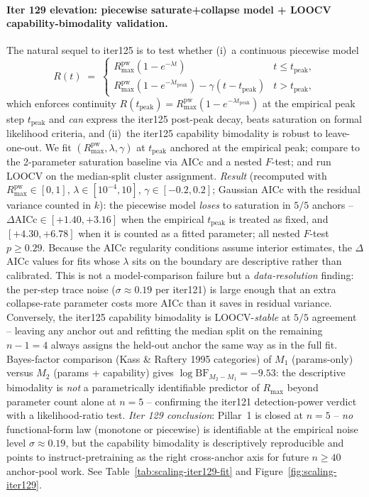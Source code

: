 \paragraph{Iter 129 elevation: piecewise saturate+collapse model + LOOCV capability-bimodality validation.}
\label{par:scaling-iter129}
The natural sequel to iter125 is to test whether (i)~a continuous
piecewise model
\begin{equation}
  \label{eq:scaling-iter129-pw}
  R(t) \;=\; \begin{cases}
    R_{\max}^{\text{pw}}(1 - e^{-\lambda t}) & t \le t_\mathrm{peak}, \\
    R_{\max}^{\text{pw}}(1 - e^{-\lambda t_\mathrm{peak}}) - \gamma(t - t_\mathrm{peak}) & t > t_\mathrm{peak},
  \end{cases}
\end{equation}
which enforces continuity $R(t_\mathrm{peak}) = R_{\max}^{\text{pw}}(1 - e^{-\lambda t_\mathrm{peak}})$ at the empirical peak step $t_\mathrm{peak}$ and \emph{can} express the iter125 post-peak decay, beats saturation on
formal likelihood criteria, and (ii)~the iter125 capability
bimodality is robust to leave-one-out.  We fit
$(R_{\max}^{\text{pw}}, \lambda, \gamma)$ at $t_\mathrm{peak}$ anchored at the
empirical peak; compare to the 2-parameter saturation baseline via
AICc \citep{burnham2002model} and a nested $F$-test; and run
LOOCV on the median-split cluster assignment.
\emph{Result} (recomputed with $R_{\max}^{\text{pw}} \in [0,1]$,
$\lambda \in [10^{-4},10]$, $\gamma \in [-0.2, 0.2]$; Gaussian AICc
with the residual variance counted in $k$): the piecewise model
\emph{loses} to saturation in $5/5$ anchors --
$\Delta\text{AICc} \in [+1.40, +3.16]$ when the empirical
$t_\mathrm{peak}$ is treated as fixed, and $[+4.30, +6.78]$ when it
is counted as a fitted parameter; all nested $F$-test $p \ge 0.29$.
Because the AICc regularity conditions assume interior estimates, the
$\Delta$AICc values for fits whose $\lambda$ sits on the boundary are
descriptive rather than calibrated.  This is not a model-comparison failure but
a \emph{data-resolution} finding: the per-step trace noise
($\sigma \approx 0.19$ per iter121) is large enough that an
extra collapse-rate parameter costs more AICc than it saves in
residual variance.  Conversely, the iter125 capability bimodality
is LOOCV-\emph{stable} at $5/5$ agreement -- leaving any anchor
out and refitting the median split on the remaining $n - 1 = 4$
always assigns the held-out anchor the same way as in the full
fit.  Bayes-factor comparison (Kass \& Raftery 1995 categories)
of $M_1$ (params-only) versus $M_2$ (params + capability) gives
$\log \mathrm{BF}_{M_2 - M_1} = -9.53$: the descriptive bimodality
is \emph{not} a parametrically identifiable predictor of $R_{\max}$
beyond parameter count alone at $n = 5$ -- confirming the iter121
detection-power verdict with a likelihood-ratio test.
\emph{Iter 129 conclusion}: Pillar~1 is closed at $n=5$ --
\emph{no} functional-form law (monotone or piecewise) is
identifiable at the empirical noise level $\sigma \approx 0.19$,
but the capability bimodality is descriptively reproducible and
points to instruct-pretraining as the right cross-anchor axis
for future $n \ge 40$ anchor-pool work.  See
Table~\ref{tab:scaling-iter129-fit} and
Figure~\ref{fig:scaling-iter129}.

